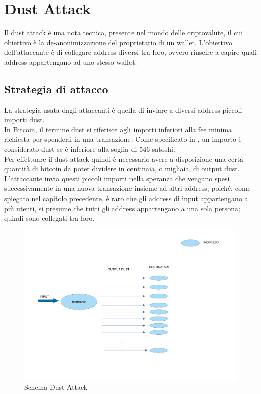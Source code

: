 \chapter{Dust Attack}
Il dust attack è una nota tecnica, presente nel mondo delle criptovalute, il cui obiettivo è la 
de-anonimizzazione del proprietario di un wallet. L'obiettivo dell'attaccante è di collegare address diversi tra loro, ovvero riuscire a capire quali address appartengano ad uno stesso wallet.\\

\section{Strategia di attacco}
La strategia usata dagli attaccanti è quella di inviare a diversi address piccoli importi dust.\\
In Bitcoin, il termine dust si riferisce agli importi inferiori alla fee minima richiesta per spenderli in una transazione. Come specificato in \cite{BtcDev}, un
importo è considerato dust se è inferiore alla soglia di 546 satoshi.\\
Per effettuare il dust attack quindi è necessario avere a disposizione una certa quantità di bitcoin da poter dividere in centinaia, o migliaia, di output dust.
L'attaccante invia questi piccoli importi nella speranza che vengano spesi successivamente in una nuova transazione insieme ad altri address, poiché, come spiegato nel capitolo precedente, è raro che gli address di input appartengano a più utenti, si presume che tutti gli address appartengano a una sola persona; quindi sono collegati tra loro.
\begin{figure}[h!]
    \centering
    \includegraphics[scale=0.5]{Images/dust_attack.pdf}
    \caption{Schema Dust Attack}
    \label{fig:Dust_attack}
\end{figure}
